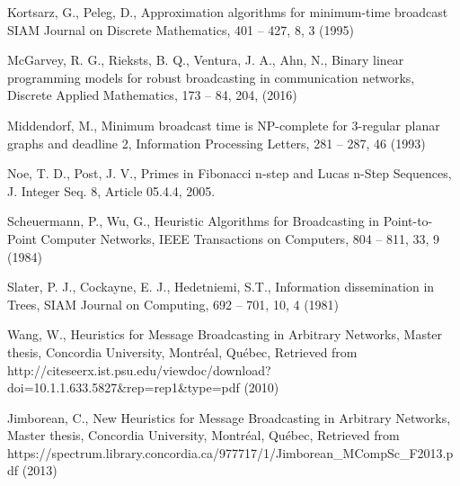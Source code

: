 \begin{thebibliography}{}
Kortsarz, G., Peleg, D.,
Approximation algorithms for minimum-time broadcast
SIAM Journal on Discrete Mathematics, 401 -- 427, 8, 3 (1995)

McGarvey, R. G., Rieksts, B. Q., Ventura, J. A., Ahn, N.,
Binary linear programming models for robust broadcasting in communication networks,
Discrete Applied Mathematics, 173 -- 84, 204, (2016)

Middendorf, M.,
Minimum broadcast time is NP-complete for 3-regular planar graphs and deadline 2,
Information Processing Letters, 281 -- 287, 46 (1993)

Noe, T. D., Post, J. V., 
Primes in Fibonacci n-step and Lucas n-Step Sequences,
J. Integer Seq. 8, Article 05.4.4, 2005.

Scheuermann, P., Wu, G.,
Heuristic Algorithms for Broadcasting in Point-to-Point Computer Networks,
IEEE Transactions on Computers, 804 -- 811, 33, 9 (1984)

Slater, P. J., Cockayne, E. J., Hedetniemi, S.T.,
Information dissemination in Trees,
SIAM Journal on Computing, 692 -- 701, 10, 4 (1981)

Wang, W.,
Heuristics for Message Broadcasting in Arbitrary Networks,
Master thesis, Concordia University, Montr\'eal, Qu\'ebec, 
Retrieved from http://citeseerx.ist.psu.edu/viewdoc/download?doi=10.1.1.633.5827\&rep=rep1\&type=pdf (2010)

Jimborean, C.,
New Heuristics for Message Broadcasting in Arbitrary Networks,
Master thesis, Concordia University, Montr\'eal, Qu\'ebec, 
Retrieved from https://spectrum.library.concordia.ca/977717/1/Jimborean\_MCompSc\_F2013.pdf (2013)


\end{thebibliography}



